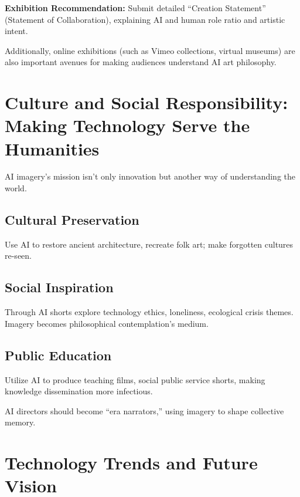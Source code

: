 \textbf{Exhibition Recommendation:} Submit detailed ``Creation Statement'' (Statement of Collaboration), explaining AI and human role ratio and artistic intent.

Additionally, online exhibitions (such as Vimeo collections, virtual museums) are also important avenues for making audiences understand AI art philosophy.

\section{Culture and Social Responsibility: Making Technology Serve the Humanities}
\label{sec:cultural-responsibility}

AI imagery's mission isn't only innovation but another way of understanding the world.

\subsection{Cultural Preservation}

Use AI to restore ancient architecture, recreate folk art; make forgotten cultures re-seen.

\subsection{Social Inspiration}

Through AI shorts explore technology ethics, loneliness, ecological crisis themes. Imagery becomes philosophical contemplation's medium.

\subsection{Public Education}

Utilize AI to produce teaching films, social public service shorts, making knowledge dissemination more infectious.

AI directors should become ``era narrators,'' using imagery to shape collective memory.

\section{Technology Trends and Future Vision}
\label{sec:technology-trends}

